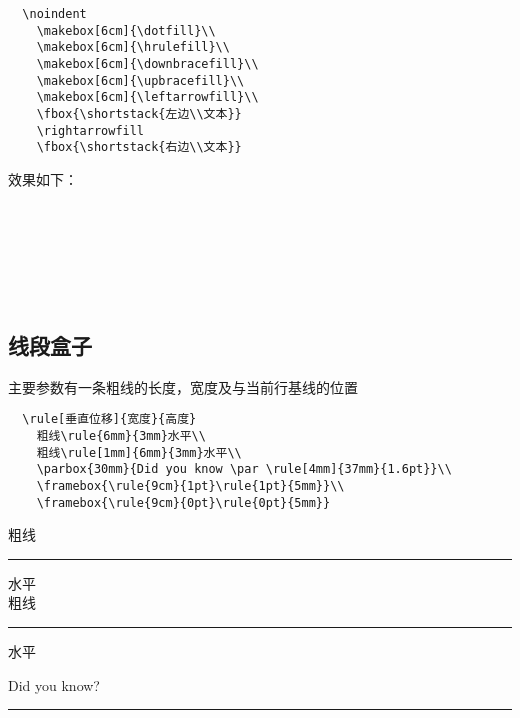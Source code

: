 \begin{shaded}
  \begin{Verbatim}
  \noindent
    \makebox[6cm]{\dotfill}\\
    \makebox[6cm]{\hrulefill}\\
    \makebox[6cm]{\downbracefill}\\
    \makebox[6cm]{\upbracefill}\\
    \makebox[6cm]{\leftarrowfill}\\
    \fbox{\shortstack{左边\\文本}}
    \rightarrowfill
    \fbox{\shortstack{右边\\文本}}
  \end{Verbatim}
\end{shaded}

效果如下：

  \noindent
    \makebox[6cm]{\dotfill}\\
    \makebox[6cm]{\hrulefill}\\
    \makebox[6cm]{\downbracefill}\\
    \makebox[6cm]{\upbracefill}\\
    \makebox[6cm]{\leftarrowfill}\\
    \rightarrowfill


\subsection{线段盒子}


主要参数有一条粗线的长度，宽度及与当前行基线的位置\\

\begin{shaded}
  \begin{Verbatim}
  \rule[垂直位移]{宽度}{高度}
    粗线\rule{6mm}{3mm}水平\\
    粗线\rule[1mm]{6mm}{3mm}水平\\
    \parbox{30mm}{Did you know \par \rule[4mm]{37mm}{1.6pt}}\\
    \framebox{\rule{9cm}{1pt}\rule{1pt}{5mm}}\\
    \framebox{\rule{9cm}{0pt}\rule{0pt}{5mm}}
  \end{Verbatim}
\end{shaded}

\noindent
    粗线\rule{6mm}{3mm}水平\\
    粗线\rule[1mm]{6mm}{3mm}水平\\
    \parbox{30mm}{Did you know?\par \rule[4mm]{37mm}{1.6pt}}\\
    \framebox{\rule{9cm}{1pt}\rule{1pt}{5mm}}\\
    \framebox{\rule{9cm}{0pt}\rule{0pt}{5mm}} %
